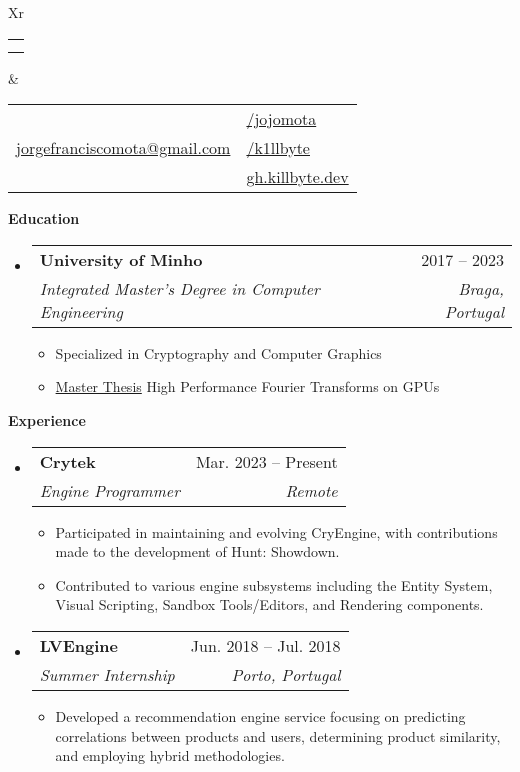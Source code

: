 \documentclass[letterpaper,12pt]{article}[leftmargin=*]
\makeatletter
\def \fullname {Jorge Mota}
\def \subtitle {}
\def \linkedinicon {\faLinkedin}
\def \linkedinlink {https://linkedin.com/in/jojomota/}
\def \linkedintext {/jojomota}
\def \emailicon {\faEnvelope}
\def \emaillink {mailto:jorgefranciscomota@gmail.com}
\def \emailtext {jorgefranciscomota@gmail.com}
\def \githubicon {\faGithub}
\def \githublink {https://github.com/k1llbyte}
\def \githubtext {/k1llbyte}
\def \websiteicon {\faGlobe}
\def \websitelink {https://gh.killbyte.dev/}
\def \websitetext {gh.killbyte.dev}
\def \headertype {\doublecol} %
\def \entryspacing {-0pt}
\def \linkedin {\linkedinicon \hspace{3pt}\href{\linkedinlink}{\linkedintext}}
\def \phone {\phoneicon \hspace{3pt}{ \phonetext}}
\def \email {\emailicon \hspace{3pt}\href{\emaillink}{\emailtext}}
\def \github {\githubicon \hspace{3pt}\href{\githublink}{\githubtext}}
\def \website {\websiteicon \hspace{3pt}\href{\websitelink}{\websitetext}}
\renewcommand{\section}[2]{\vspace{5pt}
  \colorbox{secondary}{\color{white}\raggedbottom\normalsize\textbf{{#1}{\hspace{7pt}#2\hspace{7pt}}}}
}
\newcommand{\resumeEntryStart}{\begin{itemize}[leftmargin=2.5mm]}
\newcommand{\resumeEntryEnd}{\end{itemize}\vspace{\entryspacing}}
\newcommand{\resumeItemListStart}{\begin{itemize}[leftmargin=4.5mm]}
\newcommand{\resumeItemListEnd}{\end{itemize}}
\newcommand{\resumeItem}[1]{
  \item\small{
    {#1 \vspace{-2pt}}
  }
}
\newcommand{\resumeEntryTSDL}[4]{
  \vspace{-1pt}\item[]
    \begin{tabularx}{0.97\textwidth}{X@{\hspace{60pt}}r}
      \textbf{\color{primary}#1} & {\firabook\color{accent}\small#2} \\
      \textit{\color{accent}\small#3} & \textit{\color{accent}\small#4} \\
    \end{tabularx}\vspace{-6pt}
}
\newcommand{\doublecol}[6]{
  \begin{tabularx}{\textwidth}{Xr}
    {
      \begin{tabular}[c]{l}
        \fontsize{35}{45}\selectfont{\color{primary}{{\textbf{\fullname}}}} \\
        {\textit{\subtitle}} %
      \end{tabular}
    } & {
      \begin{tabular}[c]{l@{\hspace{1.5em}}l}
        {\small#4} & {\small#1} \\
        {\small#5} & {\small#2} \\
        {\small#6} & {\small#3}
      \end{tabular}
    }
  \end{tabularx}
}
\newcommand{\singlecol}[6]{
  \begin{tabularx}{\textwidth}{Xr}
    {
      \begin{tabular}[b]{l}
        \fontsize{35}{45}\selectfont{\color{primary}{{\textbf{\fullname}}}} \\
        {\textit{\subtitle}} %
      \end{tabular}
    } & {
      \begin{tabular}[c]{l}
        {\small#1} \\
        {\small#2} \\
        {\small#3} \\
        {\small#4} \\
        {\small#5} \\
        {\small#6}
      \end{tabular}
    }
  \end{tabularx}
}
\makeatother
\begin{document}


\headertype{\linkedin}{\github}{\website}{\phone}{\email}{} %
\vspace{-10pt} %

\section{}{Education}

  \resumeEntryStart
    \resumeEntryTSDL
      {University of Minho}{2017 -- 2023}
      {Integrated Master's Degree in Computer Engineering}{Braga, Portugal}
    \resumeItemListStart
      \resumeItem {Specialized in Cryptography and Computer Graphics}
      \resumeItem {\underline{Master Thesis} High Performance Fourier Transforms on GPUs}
    \resumeItemListEnd
  \resumeEntryEnd

\section{}{Experience}

  \resumeEntryStart
    \resumeEntryTSDL
      {Crytek}{Mar. 2023 -- Present}
      {Engine Programmer}{Remote}
    \resumeItemListStart
      \resumeItem {Participated in maintaining and evolving CryEngine, with contributions made to the development of Hunt: Showdown.}
      \resumeItem {Contributed to various engine subsystems including the Entity System, Visual Scripting, Sandbox Tools/Editors, and Rendering components.}
    \resumeItemListEnd

    \resumeEntryTSDL
      {LVEngine}{Jun. 2018 -- Jul. 2018}
      {Summer Internship}{Porto, Portugal}
    \resumeItemListStart
      \resumeItem {Developed a recommendation engine service focusing on predicting correlations between products and users, determining product similarity, and employing hybrid methodologies.}
    \resumeItemListEnd
  \resumeEntryEnd

\end{document}
